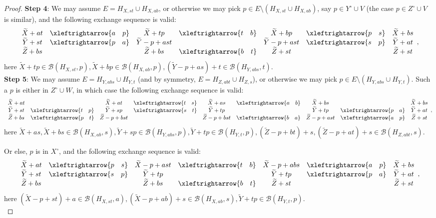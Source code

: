 \documentclass{amsart}
\newcommand{\swap}[2]{\xleftrightarrow{#1 \quad #2}}
\newcommand\Bcal{{\mathcal B}}
\begin{document}
\begin{proof}
{\bf Step 4}: We may assume $E=H_{X,st}\cup H_{X,ab}$, or otherwise we may pick $p\in E\setminus(H_{X,st}\cup H_{X,ab})$, say $p\in Y^\circ\cup V$ (the case $p\in Z^\circ\cup V$ is similar), and the following exchange sequence is valid:
$$
\begin{array}{c c c c c c c}
   \widetilde{X}+at & \swap{a}{p} & \widetilde{X}+tp & \swap{t}{b} & \widetilde{X}+bp  & \swap{p}{s} & \widetilde{X}+bs \\
   \widetilde{Y}+st &  \swap{p}{a}  & \widetilde{Y}-p+ast &         & \widetilde{Y}-p+ast & \swap{s}{p}  & \widetilde{Y}+at \\
   \widetilde{Z}+bs &          & \widetilde{Z}+bs &  \swap{b}{t}  & \widetilde{Z}+st  &         & \widetilde{Z}+st
\end{array},
$$
here $\widetilde{X}+tp\in\Bcal(H_{X,st},p), \widetilde{X}+bp\in\Bcal(H_{X,ab},p), (\widetilde{Y}-p+as)+t\in\Bcal(H_{Y,abs},t)$.\\

{\bf Step 5}: We may assume $E=H_{Y,abs}\cup H_{Y,t}$ (and by symmetry, $E=H_{Z,abt}\cup H_{Z,s}$), or otherwise we may pick $p\in E\setminus(H_{Y,abs}\cup H_{Y,t})$. Such a $p$ is either in $Z^\circ\cup W$, in which case the following exchange sequence is valid: 
$$
\begin{array}{c c c c c c c c c}
   \widetilde{X}+at &           & \widetilde{X}+at & \swap{t}{s} & \widetilde{X}+as  &  \swap{a}{b} & \widetilde{X}+bs &           & \widetilde{X}+bs \\
   \widetilde{Y}+st & \swap{t}{p}  & \widetilde{Y}+sp & \swap{s}{t} & \widetilde{Y}+tp &         & \widetilde{Y}+tp & \swap{p}{a} & \widetilde{Y}+at\\
   \widetilde{Z}+bs & \swap{p}{t}  & \widetilde{Z}-p+bst &         & \widetilde{Z}-p+bst  & \swap{b}{a} & \widetilde{Z}-p+ast & \swap{a}{p} & \widetilde{Z}+st
\end{array},
$$
here $\widetilde{X}+as,\widetilde{X}+bs\in\Bcal(H_{X,ab},s), \widetilde{Y}+sp\in\Bcal(H_{Y,abs},p), \widetilde{Y}+tp\in\Bcal(H_{Y,t},p), (\widetilde{Z}-p+bt)+s,(\widetilde{Z}-p+at)+s\in\Bcal(H_{Z,abt},s)$.

Or else, $p$ is in $X^\circ$, and the following exchange sequence is valid:
$$
\begin{array}{c c c c c c c}
   \widetilde{X}+at & \swap{p}{s} & \widetilde{X}-p+ast & \swap{t}{b} & \widetilde{X}-p+abs  & \swap{a}{p} & \widetilde{X}+bs \\
   \widetilde{Y}+st &  \swap{s}{p}  & \widetilde{Y}+tp &         & \widetilde{Y}+tp & \swap{p}{a}  & \widetilde{Y}+at \\
   \widetilde{Z}+bs &          & \widetilde{Z}+bs &  \swap{b}{t}  & \widetilde{Z}+st  &         & \widetilde{Z}+st
\end{array},
$$
here $(\widetilde{X}-p+st)+a\in\Bcal(H_{X,st},a), (\widetilde{X}-p+ab)+s\in\Bcal(H_{X,ab},s), \widetilde{Y}+tp\in\Bcal(H_{Y,t},p)$.\\


\end{proof}
\end{document}
